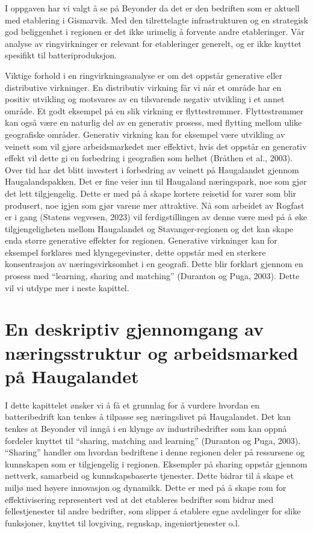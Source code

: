\documentclass[
]{article}
\begin{document}
I oppgaven har vi valgt å se på Beyonder da det er den bedriften som er
aktuell med etablering i Gismarvik. Med den tilrettelagte
infrastrukturen og en strategisk god beliggenhet i regionen er det ikke
urimelig å forvente andre etableringer. Vår analyse av ringvirkninger er
relevant for etableringer generelt, og er ikke knyttet spesifikt til
batteriproduksjon.

Viktige forhold i en ringvirkningsanalyse er om det oppstår generative
eller distributive virkninger. En distributiv virkning får vi når et
område har en positiv utvikling og motsvares av en tilsvarende negativ
utvikling i et annet område. Et godt eksempel på en slik virkning er
flyttestrømmer. Flyttestrømmer kan også være en naturlig del av en
generativ prosess, med flytting mellom ulike geografiske områder.
Generativ virkning kan for eksempel være utvikling av veinett som vil
gjøre arbeidsmarkedet mer effektivt, hvis det oppstår en generativ
effekt vil dette gi en forbedring i geografien som helhet (Bråthen et
al., 2003). Over tid har det blitt investert i forbedring av veinett på
Haugalandet gjennom Haugalandspakken. Det er fine veier inn til
Haugaland næringspark, noe som gjør det lett tilgjengelig. Dette er med
på å skape kortere reisetid for varer som blir produsert, noe igjen som
gjør varene mer attraktive. Nå som arbeidet av Rogfast er i gang
(Statens vegvesen, 2023) vil ferdigstillingen av denne være med på å øke
tilgjengeligheten mellom Haugalandet og Stavanger-regionen og det kan
skape enda større generative effekter for regionen. Generative
virkninger kan for eksempel forklares med klyngegevinster, dette oppstår
med en sterkere konsentrasjon av næringsvirksomhet i en geografi. Dette
blir forklart gjennom en prosess med ``learning, sharing and matching''
(Duranton og Puga, 2003). Dette vil vi utdype mer i neste kapittel.

\hypertarget{en-deskriptiv-gjennomgang-av-nuxe6ringsstruktur-og-arbeidsmarked-puxe5-haugalandet}{%
\section{En deskriptiv gjennomgang av næringsstruktur og arbeidsmarked
på
Haugalandet}\label{en-deskriptiv-gjennomgang-av-nuxe6ringsstruktur-og-arbeidsmarked-puxe5-haugalandet}}

I dette kapittelet ønsker vi å få et grunnlag for å vurdere hvordan en
batteribedrift kan tenkes å tilpasse seg næringslivet på Haugalandet.
Det kan tenkes at Beyonder vil inngå i en klynge av industribedrifter
som kan oppnå fordeler knyttet til ``sharing, matching and learning''
(Duranton og Puga, 2003). ``Sharing'' handler om hvordan bedriftene i
denne regionen deler på ressursene og kunnskapen som er tilgjengelig i
regionen. Eksempler på sharing oppstår gjennom nettverk, samarbeid og
kunnskapsbaserte tjenester. Dette bidrar til å skape et miljø med høyere
innovasjon og dynamikk. Dette er med på å skape rom for effektivisering
representert ved at det etableres bedrifter som bidrar med
fellestjenester til andre bedrifter, som slipper å etablere egne
avdelinger for slike funksjoner, knyttet til lovgiving, regnskap,
ingeniørtjenester o.l.
\end{document}
